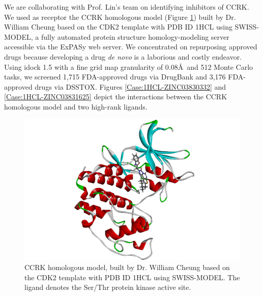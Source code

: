 We are collaborating with Prof. Lin's team on identifying inhibitors of CCRK. We used as receptor the CCRK homologous model (Figure \ref{Case:CCRKHomologousModel}) built by Dr. William Cheung based on the CDK2 template with PDB ID 1HCL \citep{1142} using SWISS-MODEL, a fully automated protein structure homology-modeling server accessible via the ExPASy web server. We concentrated on repurposing approved drugs \citep{944,1023} because developing a drug \textit{de novo} is a laborious and costly endeavor. Using idock 1.5 with a fine grid map granularity of 0.08\AA\ and 512 Monte Carlo tasks, we screened 1,715 FDA-approved drugs via DrugBank and 3,176 FDA-approved drugs via DSSTOX. Figures \ref{Case:1HCL-ZINC03830332} and \ref{Case:1HCL-ZINC03831625} depict the interactions between the CCRK homologous model and two high-rank ligands.

\begin{figure}
\centering
\includegraphics[width=\linewidth]{../ccrk/CCRKHomologousModel.png}
\caption{CCRK homologous model, built by Dr. William Cheung based on the CDK2 template with PDB ID 1HCL \citep{1142} using SWISS-MODEL. The ligand denotes the Ser/Thr protein kinase active site.}
\label{Case:CCRKHomologousModel}
\end{figure}

